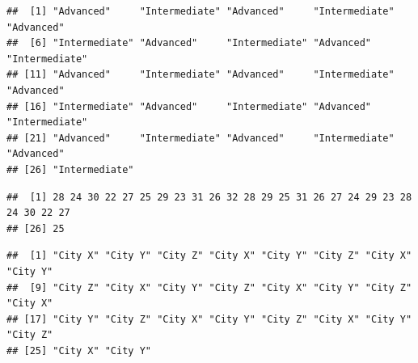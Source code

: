 \documentclass[
]{article}
\newenvironment{Shaded}{\begin{snugshade}}{\end{snugshade}}
\newcommand{\NormalTok}[1]{#1}
\newcommand{\SpecialCharTok}[1]{\textcolor[rgb]{0.81,0.36,0.00}{\textbf{#1}}}
\begin{document}
\begin{Shaded}
\end{Shaded}

\begin{verbatim}
##  [1] "Advanced"     "Intermediate" "Advanced"     "Intermediate" "Advanced"    
##  [6] "Intermediate" "Advanced"     "Intermediate" "Advanced"     "Intermediate"
## [11] "Advanced"     "Intermediate" "Advanced"     "Intermediate" "Advanced"    
## [16] "Intermediate" "Advanced"     "Intermediate" "Advanced"     "Intermediate"
## [21] "Advanced"     "Intermediate" "Advanced"     "Intermediate" "Advanced"    
## [26] "Intermediate"
\end{verbatim}

\begin{Shaded}
\end{Shaded}

\begin{verbatim}
##  [1] 28 24 30 22 27 25 29 23 31 26 32 28 29 25 31 26 27 24 29 23 28 24 30 22 27
## [26] 25
\end{verbatim}

\begin{Shaded}
\end{Shaded}

\begin{verbatim}
##  [1] "City X" "City Y" "City Z" "City X" "City Y" "City Z" "City X" "City Y"
##  [9] "City Z" "City X" "City Y" "City Z" "City X" "City Y" "City Z" "City X"
## [17] "City Y" "City Z" "City X" "City Y" "City Z" "City X" "City Y" "City Z"
## [25] "City X" "City Y"
\end{verbatim}

\begin{Shaded}
\end{Shaded}
\end{document}
